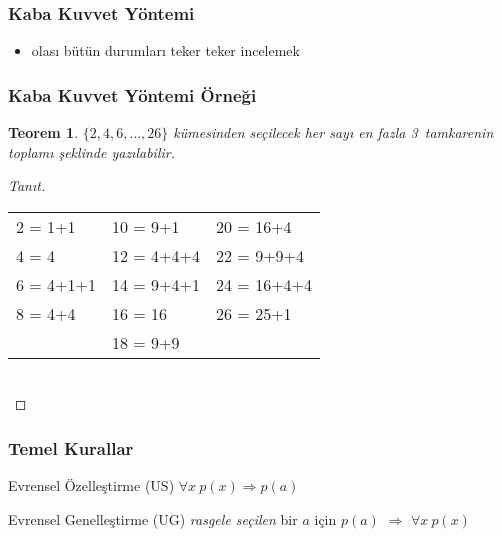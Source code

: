 \documentclass[dvipsnames]{beamer}
\theoremstyle{definition}
\theoremstyle{example}
\theoremstyle{plain}
\newtheorem{teorem}[theorem]{Teorem}
\begin{document}
\begin{frame}
  \frametitle{Kaba Kuvvet Yöntemi}

  \begin{itemize}
    \item olası bütün durumları teker teker incelemek
  \end{itemize}
\end{frame}

\begin{frame}
  \frametitle{Kaba Kuvvet Yöntemi Örneği}

  \begin{teorem}
    $\{2,4,6,\dots,26\}$ kümesinden seçilecek her sayı en fazla 3~tamkarenin
    toplamı şeklinde yazılabilir.
  \end{teorem}

  \pause
  \begin{proof}[Tanıt]
    \begin{tabular}{lll}
      2 = 1+1   & 10 = 9+1    & 20 = 16+4\\
      4 = 4     & 12 = 4+4+4  & 22 = 9+9+4\\
      6 = 4+1+1 & 14 = 9+4+1  & 24 = 16+4+4\\
      8 = 4+4   & 16 = 16     & 26 = 25+1\\
                & 18 = 9+9    &
    \end{tabular}\\
  \end{proof}
\end{frame}

\begin{frame}
  \frametitle{Temel Kurallar}

  \begin{block}{Evrensel Özelleştirme (US)}
    $\forall x~p(x) \Rightarrow p(a)$
  \end{block}

  \pause
  \begin{block}{Evrensel Genelleştirme (UG)}
    \emph{rasgele seçilen} bir $a$ için $p(a)$
      $\Rightarrow$ $\forall x~p(x)$
  \end{block}
\end{frame}
\end{document}
